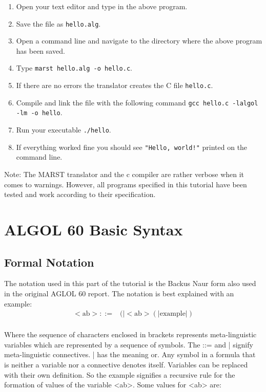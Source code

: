 \documentclass{article}
\begin{document}
\begin{enumerate}
	\item Open your text editor and type in the above program.
	\item Save the file as \texttt{hello.alg}.
	\item Open a command line and navigate to the directory where the above program has been saved.
	\item Type \texttt{marst hello.alg -o hello.c}.
	\item If there are no errors the translator creates the C file \texttt{hello.c}.
	\item Compile and link the file with the following command \texttt{gcc hello.c -lalgol -lm -o hello}.
	\item Run your executable \texttt{./hello}.
	\item If everything worked fine you should see \texttt{"Hello, world!"} printed on the command line.
\end{enumerate}

Note: The MARST translator and the c compiler are rather verbose when it comes to warnings. However, all programs specified in this tutorial have been tested and work according to their specification.

\newpage

\section{ALGOL 60 Basic Syntax}

\subsection{Formal Notation}
The notation used in this part of the tutorial is the Backus Naur form also used in the original AGLOL 60 report. The notation is best explained with an example:\\

\begin{equation} \label{eq1}
\begin{split}
<\text{ab}> ::=&( |<\text{ab}>(|\text{example}|)  \\
\end{split}
\end{equation}

Where the sequence of characters enclosed in brackets represents meta-linguistic variables which are represented by a sequence of symbols. The ::= and | signify meta-linguistic connectives. | has the meaning or. Any symbol in a formula that is neither a variable nor a connective denotes itself. Variables can be replaced with their own definition. So the example signifies a recursive rule for the formation of values of the variable <ab>. Some values for <ab> are:\\
\end{document}
